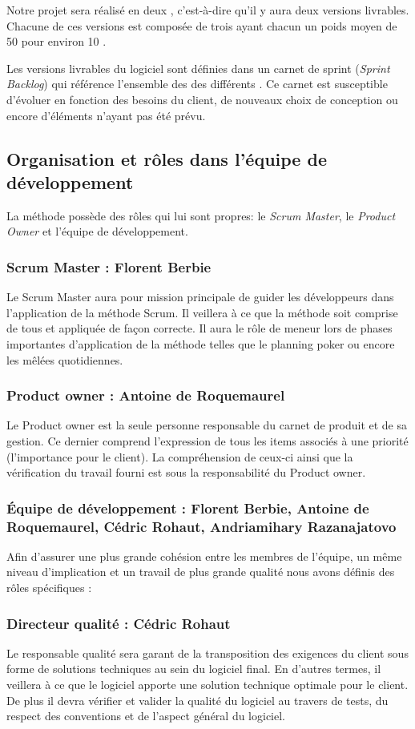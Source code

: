 Notre projet sera réalisé en deux \releases{}, c'est-à-dire qu'il y aura deux versions livrables. Chacune de ces versions est composée de trois 
\sprints{}  ayant chacun un poids moyen de 50 pour environ 10 \stories{}.

Les versions livrables du logiciel sont définies dans un carnet de sprint (\textit{Sprint Backlog}) qui référence l'ensemble des \stories{} des
différents \sprints{}. Ce carnet est susceptible d’évoluer en fonction des besoins du client, de nouveaux choix de conception ou encore d’éléments
n’ayant pas été prévu. 

\subsection{Organisation et rôles dans l'équipe de développement}
La méthode \scrum{} possède des rôles qui lui sont propres: le \textit{Scrum Master}, le \textit{Product Owner} et l'équipe de développement. 

\subsubsection{Scrum Master : Florent Berbie}
Le Scrum Master aura pour mission principale de guider les développeurs dans l'application de la méthode Scrum. Il veillera à ce que la méthode soit
comprise de tous et appliquée de façon correcte. Il aura le rôle de meneur lors de phases importantes d’application de la méthode telles que le
planning poker ou encore les mêlées quotidiennes.
\subsubsection{Product owner : Antoine de Roquemaurel}
Le Product owner est la seule personne responsable du carnet de produit et de sa gestion. Ce dernier comprend l’expression de tous les items associés
à une priorité (l’importance pour le client). La compréhension de ceux-ci ainsi que la vérification du travail fourni est sous la responsabilité du
Product owner.
\subsubsection{Équipe de développement : Florent Berbie, Antoine de Roquemaurel, Cédric Rohaut, Andriamihary Razanajatovo}
Afin d’assurer une plus grande cohésion entre les membres de l’équipe, un même niveau d’implication et un travail de plus grande qualité nous avons
définis des rôles spécifiques : 
\subsubsection{Directeur qualité : Cédric Rohaut}
Le responsable qualité sera garant de la transposition des exigences du client sous forme de solutions techniques au sein du logiciel final. En
d’autres termes, il veillera à ce que le logiciel apporte une solution technique optimale pour le client. De plus il devra vérifier et valider la
qualité du logiciel au travers de tests, du respect des conventions et de l’aspect général du logiciel.

